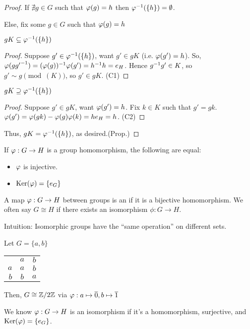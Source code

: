 \documentclass[notes.tex]{subfiles}
\begin{document}
\begin{proof}
	If $\nexists g\in G$ such that $\varphi(g) = h$ then ${\varphi}^{-1}(\{h\}) = \emptyset$.

	Else, fix some $g\in G$ such that $\varphi(g)=h$
	\begin{claim}[1]
		$gK \subseteq {\varphi}^{-1}(\{h\})$
	\end{claim} 
	\begin{proof}
		Suppose $g' \in {\varphi}^{-1}(\{h\})$, want $g'\in gK$ (i.e. $\varphi(g')=h$).
		So, $\varphi(g {g'}^{-1}) = (\varphi(g))^{-1}\varphi(g') = {h}^{-1} h=e_H$.
		Hence ${g}^{-1}g'\in K$, so $g'\sim g \pmod(K)$, so $g'\in gK$.
		\qedhere(C1)
	\end{proof}
	\begin{claim}[1]
		$gK \supseteq {\varphi}^{-1}(\{h\})$
	\end{claim} 
	\begin{proof}
		Suppose $g' \in gK$, want $\varphi(g')=h$.
		Fix $k\in K$ such that $g'=gk$.
		$\varphi(g') = \varphi(gk) - \varphi(g)\varphi(k) = he_H = h$.
		\qedhere(C2)
	\end{proof}
	Thus, $gK = {\varphi}^{-1}(\{h\})$, as desired.\qedhere(Prop.)
\end{proof}

\begin{corollary}
	If $\varphi:G\to H$ is a group homomorphism, the following are equal:
	\begin{itemize}
		\item $\varphi$ is injective.
		\item $\operatorname{\mathrm{Ker}}(\varphi) = \{e_G\}$
	\end{itemize}
\end{corollary}

\begin{defn}
	A map $\varphi:G\to H$ between groups is an  if it is a bijective homomorphism.
	We often say $G\cong H$ if there exists an isomorphism $\phi:G\to H$.
\end{defn}

Intuition: Isomorphic groups have the ``same operation'' on different sets.

\begin{eg}
	Let $G = \{a, b\}$ 
	\begin{tabular}{r|cc}
		& $a$ & $b$\\\cline{2-3}
		$a$ & $a$ & $b$\\
		$b$ & $b$ & $a$
	\end{tabular}
	Then, $G\cong \mathbb{Z}/2\mathbb{Z}$ via $\varphi : a\mapsto \overline{0}, b\mapsto\overline{1}$
\end{eg}

We know $\varphi:G\to H$ is an isomorphism if it's a homomorphism, surjective, and $\operatorname{\mathrm{Ker}}(\varphi) = \{e_G\}$.
\end{document}
